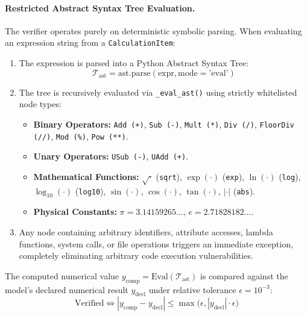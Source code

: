\paragraph{Restricted Abstract Syntax Tree Evaluation.}
The verifier operates purely on deterministic symbolic parsing. When evaluating an expression string from a \texttt{CalculationItem}:
\begin{enumerate}
    \item The expression is parsed into a Python Abstract Syntax Tree:
    \begin{equation}
    \mathcal{T}_{\text{ast}} = \text{ast.parse}(\text{expr}, \text{mode}=\text{'eval'})
    \end{equation}
    \item The tree is recursively evaluated via \texttt{\_eval\_ast()} using strictly whitelisted node types:
    \begin{itemize}
        \item \textbf{Binary Operators:} \texttt{Add (+)}, \texttt{Sub (-)}, \texttt{Mult (*)}, \texttt{Div (/)}, \texttt{FloorDiv (//)}, \texttt{Mod (\%)}, \texttt{Pow (**)}.
        \item \textbf{Unary Operators:} \texttt{USub (-)}, \texttt{UAdd (+)}.
        \item \textbf{Mathematical Functions:} $\sqrt{\cdot}$ (\texttt{sqrt}), $\exp(\cdot)$ (\texttt{exp}), $\ln(\cdot)$ (\texttt{log}), $\log_{10}(\cdot)$ (\texttt{log10}), $\sin(\cdot)$, $\cos(\cdot)$, $\tan(\cdot)$, $|\cdot|$ (\texttt{abs}).
        \item \textbf{Physical Constants:} $\pi = 3.14159265\dots$, $e = 2.71828182\dots$.
    \end{itemize}
    \item Any node containing arbitrary identifiers, attribute accesses, lambda functions, system calls, or file operations triggers an immediate exception, completely eliminating arbitrary code execution vulnerabilities.
\end{enumerate}

The computed numerical value $y_{\text{comp}} = \text{Eval}(\mathcal{T}_{\text{ast}})$ is compared against the model's declared numerical result $y_{\text{decl}}$ under relative tolerance $\epsilon = 10^{-3}$:
\begin{equation}
\text{Verified} \iff |y_{\text{comp}} - y_{\text{decl}}| \le \max\big(\epsilon, |y_{\text{decl}}| \cdot \epsilon\big)
\end{equation}

